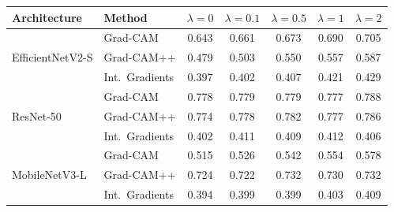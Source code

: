 \begin{tabular}{ll ccccc}
\toprule
\textbf{Architecture} & \textbf{Method} & $\lambda=0$ & $\lambda=0.1$ & $\lambda=0.5$ & $\lambda=1$ & $\lambda=2$ \\
\midrule
\multirow{3}{*}{EfficientNetV2-S}
 & Grad-CAM & 0.643 & 0.661 & 0.673 & 0.690 & 0.705 \\
 & Grad-CAM++ & 0.479 & 0.503 & 0.550 & 0.557 & 0.587 \\
 & Int.\ Gradients & 0.397 & 0.402 & 0.407 & 0.421 & 0.429 \\
\midrule
\multirow{3}{*}{ResNet-50}
 & Grad-CAM & 0.778 & 0.779 & 0.779 & 0.777 & 0.788 \\
 & Grad-CAM++ & 0.774 & 0.778 & 0.782 & 0.777 & 0.786 \\
 & Int.\ Gradients & 0.402 & 0.411 & 0.409 & 0.412 & 0.406 \\
\midrule
\multirow{3}{*}{MobileNetV3-L}
 & Grad-CAM & 0.515 & 0.526 & 0.542 & 0.554 & 0.578 \\
 & Grad-CAM++ & 0.724 & 0.722 & 0.732 & 0.730 & 0.732 \\
 & Int.\ Gradients & 0.394 & 0.399 & 0.399 & 0.403 & 0.409 \\
\bottomrule
\end{tabular}
